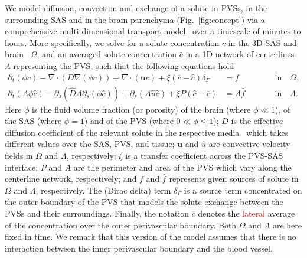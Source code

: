 \documentclass[fleqn,10pt]{wlscirep}
\newcommand{\rami}[1]{\textcolor{blue}{#1}}
\newcommand{\mer}[1]{\textcolor{magenta}{#1}}
\newcommand{\discuss}[1]{\textcolor{red}{#1}}
\begin{document}
We model diffusion, convection and exchange of a solute in PVSs, in the surrounding SAS and in the brain parenchyma (Fig.~\ref{fig:concept}) via a comprehensive multi-dimensional transport model~\cite{masri2023modelling} over a timescale of minutes to hours. More specifically, we solve for a solute concentration $c$ in the 3D SAS and brain~\cite{sykova2008diffusion} $\Omega$, and an averaged solute concentration $\hat c$ in a 1D network of centerlines $\Lambda$ representing the PVS, such that the following equations hold
\begin{subequations}
\begin{alignat}{2}
  \partial_t (\phi c) - \nabla \cdot (D \nabla (\phi c) ) + \nabla \cdot (\bm u c ) + \xi (\overline{c} - \hat c ) \delta_\Gamma & = f && \quad \quad \mathrm{in} \quad \Omega, \\ 
  \partial_t (A \phi \hat c) - \partial_s(\hat D A \partial_s (\phi \hat c)) +\partial_s(A \hat u \hat c )  +  \xi P (\hat c - \overline{c})  &= A \hat f && \quad \quad \mathrm{in} \quad  \Lambda .
 \end{alignat}
\end{subequations}
Here $\phi$ is the fluid volume fraction (or porosity) of the brain (where $\phi \ll 1$), of the SAS (where $\phi = 1$) and of the PVS (where $0 \ll \phi \leq 1$); $D$ is the effective diffusion coefficient of the relevant solute in the respective media~\cite{sykova2008diffusion} which takes different values over the SAS, PVS, and tissue; $\bm u$ and $\hat u$ are convective velocity fields in $\Omega$ and $\Lambda$, respectively; $\xi$ is a transfer coefficient across the PVS-SAS interface; $P$ and $A$ are the perimeter and area of the PVS which vary along the centerline network, respectively; and $f$ and $\hat{f}$ represents given sources of solute in $\Omega$ and $\Lambda$, respectively.  The (Dirac delta) term $\delta_\Gamma$ is a source term concentrated on the outer boundary of the PVS that models the solute exchange between the PVSs and their surroundings. Finally, the notation $\overline{c}$ denotes the \discuss{lateral} average of the concentration over the outer perivascular boundary. Both $\Omega$ and $\Lambda$ are here fixed in time. We remark that this version of the model assumes that there is no interaction between the inner perivascular boundary and the blood vessel. 

\end{document}
